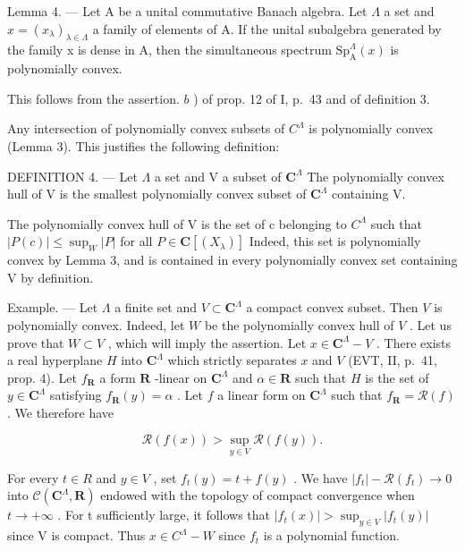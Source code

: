 Lemma 4. --- Let A be a unital commutative Banach algebra. Let \(\Lambda\) a set and \(x = (x_{\lambda})_{\lambda \in \Lambda}\) a family of elements of A. If the unital subalgebra generated by the family x is dense in A, then the simultaneous spectrum \(\mathrm{Sp}_{\mathrm{A}}^{\Lambda}(x)\) is polynomially convex.

This follows from the assertion. \(b\) ) of prop. 12 of I, p.~43 and of definition 3.

Any intersection of polynomially convex subsets of \(C^{\Lambda}\) is polynomially convex (Lemma 3). This justifies the following definition:

DEFINITION 4. --- Let \(\Lambda\) a set and V a subset of \(\mathbf{C}^{\Lambda}\) The polynomially convex hull of V is the smallest polynomially convex subset of \(\mathbf{C}^{\Lambda}\) containing V.

The polynomially convex hull of V is the set of c belonging to \(C^{\Lambda}\) such that \(|P(c)| \leqslant \sup_{W} |P|\) for all \(P \in \mathbf{C}[(X_{\lambda})]\) Indeed, this set is polynomially convex by Lemma 3, and is contained in every polynomially convex set containing V by definition.

Example. --- Let \(\Lambda\) a finite set and \(V \subset \mathbf{C}^{\Lambda}\) a compact convex subset. Then \(V\) is polynomially convex. Indeed, let \(W\) be the polynomially convex hull of \(V\) . Let us prove that \(W \subset V\) , which will imply the assertion. Let \(x \in \mathbf{C}^{\Lambda} - V\) . There exists a real hyperplane \(H\) into \(\mathbf{C}^{\Lambda}\) which strictly separates \(x\) and \(V\) (EVT, II, p.~41, prop. 4). Let \(f_{\mathbf{R}}\) a form \(\mathbf{R}\) -linear on \(\mathbf{C}^{\Lambda}\) and \(\alpha \in \mathbf{R}\) such that \(H\) is the set of \(y \in \mathbf{C}^{\Lambda}\) satisfying \(f_{\mathbf{R}}(y) = \alpha\) . Let \(f\) a linear form on \(\mathbf{C}^{\Lambda}\) such that \(f_{\mathbf{R}} = \mathcal{R}(f)\) . We therefore have

\[
\mathcal {R} (f (x)) > \sup _ {y \in V} \mathcal {R} (f (y)).
\]

For every \(t \in R\) and \(y \in V\) , set \(f_{t}(y) = t + f(y)\) . We have \(|f_{t}| - \mathcal{R}(f_{t}) \to 0\) into \(\mathcal{C}(\mathbf{C}^{\Lambda}, \mathbf{R})\) endowed with the topology of compact convergence when \(t \to +\infty\) . For t sufficiently large, it follows that \(|f_{t}(x)| > \sup_{y \in V} |f_{t}(y)|\) since V is compact. Thus \(x \in C^{\Lambda} - W\) since \(f_{t}\) is a polynomial function.

